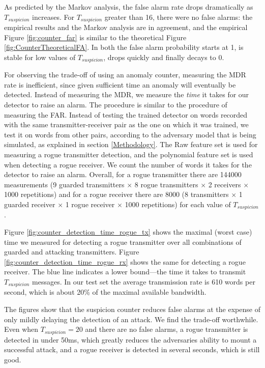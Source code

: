\documentclass[english]{llncs}
\begin{document}
  As predicted by the Markov analysis, the false alarm rate drops dramatically as $T_{suspicion}$ increases. For $T_{suspicion}$ greater than 16, there were no false alarms: the empirical results and the Markov analysis are in agreement, and the empirical Figure \ref{fig:counter_far} is similar to the theoretical Figure \ref{fig:CounterTheoreticalFA}. In both the false alarm probability starts at 1, is stable for low values of $T_{suspicion}$, drops quickly and finally decays to 0.
  
  For observing the trade-off of using an anomaly counter, measuring the MDR rate is inefficient, since given sufficient time an anomaly will eventually be detected. Instead of measuring the MDR, we measure the \emph{time} it takes for our detector to raise an alarm. The procedure is similar to the procedure of measuring the FAR. Instead of testing the trained detector on words recorded with the same transmitter-receiver pair as the one on which it was trained, we test it on words from other pairs, according to the adversary model that is being simulated, as explained in section \ref{Methodology}. The Raw feature set is used for measuring a rogue transmitter detection, and the polynomial feature set is used when detecting a rogue receiver. We count the number of words it takes for the detector to raise an alarm. Overall, for a rogue transmitter there are 144000 measurements (9 guarded transmitters $\times$ 8 rogue transmitters $\times$ 2 receivers $\times$ 1000 repetitions) and for a rogue receiver there are 8000
  (8 transmitters $\times$ 1 guarded receiver $\times$ 1 rogue receiver $\times$ 1000 repetitions) for each value of $T_{suspicion}$.
  
  Figure \ref{fig:counter_detection_time_rogue_tx} shows the maximal (worst case) time we measured for detecting a rogue transmitter over all combinations of guarded and attacking transmitters. Figure \ref{fig:counter_detection_time_rogue_rx} shows the same for detecting a rogue receiver. The blue line indicates a lower bound---the time it takes to transmit $T_{suspicion}$ messages. In our test set the average transmission rate is 610 words per second, which is about 20\% of the maximal available bandwidth.
  
  
  The figures show that the suspicion counter reduces false alarms at the expense of only mildly delaying the detection of an attack. We find the trade-off worthwhile. Even when $T_{suspicion} = 20$ and there are no false alarms, a rogue transmitter is detected in under 50ms, which greatly reduces the adversaries ability to mount a successful attack, and a rogue receiver is detected in several seconds, which is still good.
  
\end{document}
